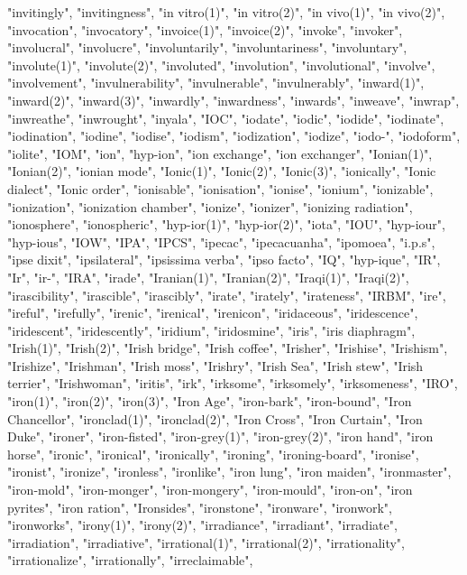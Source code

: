 "invitingly",
"invitingness",
"in vitro(1)",
"in vitro(2)",
"in vivo(1)",
"in vivo(2)",
"invocation",
"invocatory",
"invoice(1)",
"invoice(2)",
"invoke",
"invoker",
"involucral",
"involucre",
"involuntarily",
"involuntariness",
"involuntary",
"involute(1)",
"involute(2)",
"involuted",
"involution",
"involutional",
"involve",
"involvement",
"invulnerability",
"invulnerable",
"invulnerably",
"inward(1)",
"inward(2)",
"inward(3)",
"inwardly",
"inwardness",
"inwards",
"inweave",
"inwrap",
"inwreathe",
"inwrought",
"inyala",
"IOC",
"iodate",
"iodic",
"iodide",
"iodinate",
"iodination",
"iodine",
"iodise",
"iodism",
"iodization",
"iodize",
"iodo-",
"iodoform",
"iolite",
"IOM",
"ion",
"hyp-ion",
"ion exchange",
"ion exchanger",
"Ionian(1)",
"Ionian(2)",
"ionian mode",
"Ionic(1)",
"Ionic(2)",
"Ionic(3)",
"ionically",
"Ionic dialect",
"Ionic order",
"ionisable",
"ionisation",
"ionise",
"ionium",
"ionizable",
"ionization",
"ionization chamber",
"ionize",
"ionizer",
"ionizing radiation",
"ionosphere",
"ionospheric",
"hyp-ior(1)",
"hyp-ior(2)",
"iota",
"IOU",
"hyp-iour",
"hyp-ious",
"IOW",
"IPA",
"IPCS",
"ipecac",
"ipecacuanha",
"ipomoea",
"i.p.s",
"ipse dixit",
"ipsilateral",
"ipsissima verba",
"ipso facto",
"IQ",
"hyp-ique",
"IR",
"Ir",
"ir-",
"IRA",
"irade",
"Iranian(1)",
"Iranian(2)",
"Iraqi(1)",
"Iraqi(2)",
"irascibility",
"irascible",
"irascibly",
"irate",
"irately",
"irateness",
"IRBM",
"ire",
"ireful",
"irefully",
"irenic",
"irenical",
"irenicon",
"iridaceous",
"iridescence",
"iridescent",
"iridescently",
"iridium",
"iridosmine",
"iris",
"iris diaphragm",
"Irish(1)",
"Irish(2)",
"Irish bridge",
"Irish coffee",
"Irisher",
"Irishise",
"Irishism",
"Irishize",
"Irishman",
"Irish moss",
"Irishry",
"Irish Sea",
"Irish stew",
"Irish terrier",
"Irishwoman",
"iritis",
"irk",
"irksome",
"irksomely",
"irksomeness",
"IRO",
"iron(1)",
"iron(2)",
"iron(3)",
"Iron Age",
"iron-bark",
"iron-bound",
"Iron Chancellor",
"ironclad(1)",
"ironclad(2)",
"Iron Cross",
"Iron Curtain",
"Iron Duke",
"ironer",
"iron-fisted",
"iron-grey(1)",
"iron-grey(2)",
"iron hand",
"iron horse",
"ironic",
"ironical",
"ironically",
"ironing",
"ironing-board",
"ironise",
"ironist",
"ironize",
"ironless",
"ironlike",
"iron lung",
"iron maiden",
"ironmaster",
"iron-mold",
"iron-monger",
"iron-mongery",
"iron-mould",
"iron-on",
"iron pyrites",
"iron ration",
"Ironsides",
"ironstone",
"ironware",
"ironwork",
"ironworks",
"irony(1)",
"irony(2)",
"irradiance",
"irradiant",
"irradiate",
"irradiation",
"irradiative",
"irrational(1)",
"irrational(2)",
"irrationality",
"irrationalize",
"irrationally",
"irreclaimable",
